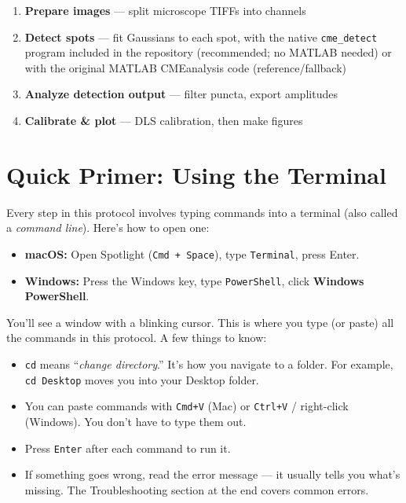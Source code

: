 \documentclass[11pt]{article}
\newcommand{\code}[1]{\texttt{#1}}
\begin{document}
\begin{enumerate}[leftmargin=*]
    \item \textbf{Prepare images} --- split microscope TIFFs into channels
    \item \textbf{Detect spots} --- fit Gaussians to each spot, with the
    native \code{cme\_detect} program included in the repository
    (recommended; no MATLAB needed) or with the original MATLAB
    CMEanalysis code (reference/fallback)
    \item \textbf{Analyze detection output} --- filter puncta, export amplitudes
    \item \textbf{Calibrate \& plot} --- DLS calibration, then make figures
\end{enumerate}

\section{Quick Primer: Using the Terminal}

Every step in this protocol involves typing commands into a terminal
(also called a \emph{command line}). Here's how to open one:

\begin{itemize}[leftmargin=*]
    \item \textbf{macOS:} Open Spotlight (\code{Cmd + Space}), type
    \code{Terminal}, press Enter.
    \item \textbf{Windows:} Press the Windows key, type
    \code{PowerShell}, click \textbf{Windows PowerShell}.
\end{itemize}

You'll see a window with a blinking cursor. This is where you type (or
paste) all the commands in this protocol. A few things to know:

\begin{itemize}[leftmargin=*]
    \item \code{cd} means ``\emph{change directory}.'' It's how you
    navigate to a folder. For example, \code{cd Desktop} moves you
    into your Desktop folder.
    \item You can paste commands with \code{Cmd+V} (Mac) or \code{Ctrl+V}
    / right-click (Windows). You don't have to type them out.
    \item Press \code{Enter} after each command to run it.
    \item If something goes wrong, read the error message --- it usually
    tells you what's missing. The Troubleshooting section at the end
    covers common errors.
\end{itemize}
\end{document}
